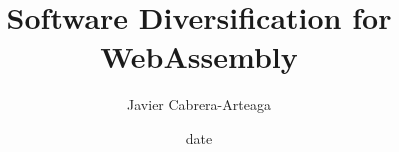 
\title{ Software Diversification for WebAssembly }
\author{Javier Cabrera-Arteaga }
\date{date}


\address{KTH Royal Institute of Technology \\School of Electrical Engineering and Computer Science\\ Division of Software and Computer Systems \\ SE-10044 Stockholm\\ Sweden}
